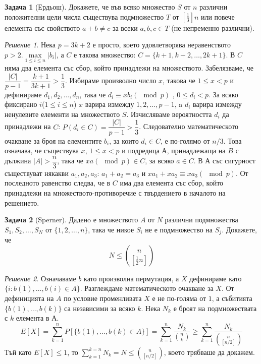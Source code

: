 \documentclass[11 pt, a4paper]{article}
\theoremstyle{definition}
\newtheorem{p}{Задача}
\theoremstyle{remark}
\newtheorem*{s}{Решение}
\begin{document}
\begin{p}[Ердьош]

Докажете, че във всяко множество $S$ от $n$ различни положителни цели числа съществува подмножество $T$ от $\left[\frac{1}{3}\right]n$ или повече елемента със свойството $a+b \neq c$ за всеки $a, b, c\in T$ (не непременно различни).\par
\end{p}
\begin{s}
Нека $p=3k+2$ е просто, което удовлетворява неравенството $p>2.\underset{1 \leq i \leq n}{\max}|b_i|$, а $C$ е такова множество: $C=\{k+1, k+2,\dots,2k+1\}$. В $C$ няма два елемента със сбор, който принадлежи на множеството. Забелязваме, че $\dfrac{|C|}{p-1}=\dfrac{k+1}{3k+1}>\dfrac{1}{3}$. Избираме произволно число $x$, такова че $1\leq x<p$ и дефинираме $d_1, d_2,\dots,d_n$, така че $d_i \equiv x b_i (\mod{p})$ , $0\leq d_i<p$. За всяко фиксирано $i$($1\leq i\leq n$) $x$ варира измежду $1,2,\dots,p-1$, a $d_i$ варира измежду ненулевите елементи на множеството $S$. Изчисляваме вероятността $d_i$ да принадлежи на $C$: $P(d_i\in C)=\dfrac{|C|}{p-1}>\dfrac{1}{3}$. Следователно математическото очакване за броя на елементите $b_i$, за които $d_i\in C$, е по-голямо от $n/3$. Това означава, че съществува $x$, $1\leq x<p$ и подредица $А$, принадлежаща на $B$ с дължина $|A|>\dfrac{n}{3}$, така че $x a(\mod{p})\in C$, за всяко $a\in C$. В $А$ със сигурност съществуват някакви $a_1,a_2,a_3$: $a_1+a_2=a_3$ и $x a_1+x a_2\equiv x a_3 (\mod{p})$. От последното равенство следва, че в $C$ има два елемента със сбор, който принадлежи на множеството-противоречие с твърдението в началото на решението.   \\
\end{s}
\begin{p}[Sperner]

Даденo е множеството $A$ от $N$ различни подмножества $S_1,S_2,\dots,S_N$ от $\{1,2,\dots,n\}$, така че никое $S_i$ не е подмножество на $S_j$. Докажете, че
\begin{equation*}
N \leq {{n} \choose {\left[\frac{1}{2}n\right]}}
\end{equation*}
\end{p}
\begin{s}
Означаваме $b$ като произволна пермутация, а $X$ дефинираме като $\big\{i:b(1),\dots,b(i)\in A\big\}$.
Разглеждаме математическото очакване за $X$.
От дефиницията на $A$ по условие променливата $X$ е не по-голяма от $1$, а събитията $\big\{b(1),\dots,b(k)\big\}$ са независими за всяко $k$.
Нека $N_k$ е броят на подмножествата с $k$ елемента в $А$.
\begin{equation*}
    E[X]=\sum_{k=1}^{n}P\left[\big\{b(1),\dots,b(k)\in A\big\}\right]=\sum_{k=1}^{n}\dfrac{N_k}{{n\choose{k}}}\geq\sum_{k=1}^{n}\dfrac{N_k}{{n\choose{[n/2]}}}
\end{equation*}
Тъй като $E[X]\leq1$, то $\sum_{k=1}^{k=n} N_k=N\leq{{n\choose{\left[n/2\right]}}}$, което трябваше да докажем. 
\end{s}
\end{document}
